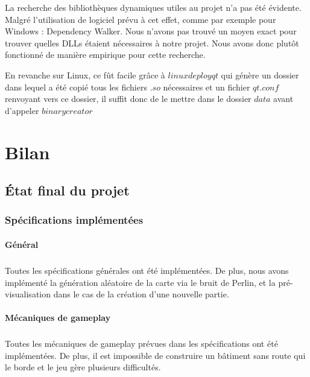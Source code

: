 \documentclass[a4paper,10pt,openany,oneside]{report}
\begin{document}
La recherche des bibliothèques dynamiques utiles au projet n'a pas été évidente. Malgré l'utilisation de logiciel prévu à cet effet, comme par exemple pour Windows : Dependency Walker. Nous n'avons pas trouvé un moyen exact pour trouver quelles DLLs étaient nécessaires à notre projet. Nous avons donc plutôt fonctionné de manière empirique pour cette recherche.
\newline

En revanche sur Linux, ce fût facile grâce à $linuxdeployqt$ qui génère un dossier dans lequel a été copié tous les fichiers $.so$ nécessaires et un fichier $qt.conf$ renvoyant vers ce dossier, il suffit donc de le mettre dans le dossier $data$ avant d'appeler $binarycreator$



\chapter{Bilan}
\thispagestyle{headings}
\section{État final du projet}
\subsection{Spécifications implémentées}
\subsubsection{Général}
\paragraph{}
Toutes les spécifications générales ont été implémentées.
De plus, nous avons implémenté la génération aléatoire de la carte via le bruit de Perlin, et la pré-visualisation dans le cas de la création d'une nouvelle partie.
\subsubsection{Mécaniques de gameplay}
\paragraph{}
Toutes les mécaniques de gameplay prévues dans les spécifications ont été implémentées.
De plus, il est impossible de construire un bâtiment sans route qui le borde et le jeu gère plusieurs difficultés.
\end{document}
